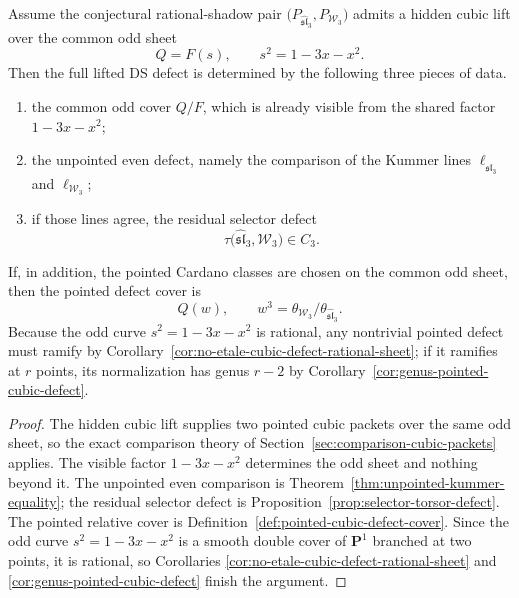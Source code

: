 \begin{theorem}
\label{thm:cubic-rational-shadow-frontier}
Assume the conjectural rational-shadow pair
$\bigl(P_{\widehat{\mathfrak{sl}}_3},P_{\mathcal W_3}\bigr)$ admits a hidden cubic
lift over the common odd sheet
\[
Q=F(s),\qquad s^2=1-3x-x^2.
\]
Then the full lifted DS defect is determined by the following three pieces of
data.
\begin{enumerate}[label=\textup{(\roman*)}]
\item the common odd cover $Q/F$, which is already visible from the shared factor
$1-3x-x^2$;
\item the unpointed even defect, namely the comparison of the Kummer lines
$\ell_{\widehat{\mathfrak{sl}}_3}$ and $\ell_{\mathcal W_3}$;
\item if those lines agree, the residual selector defect
\[
\tau\bigl(\widehat{\mathfrak{sl}}_3,\mathcal W_3\bigr)\in C_3.
\]
\end{enumerate}
If, in addition, the pointed Cardano classes are chosen on the common odd sheet,
then the pointed defect cover is
\[
Q(w),\qquad
w^3=\theta_{\mathcal W_3}/\theta_{\widehat{\mathfrak{sl}}_3}.
\]
Because the odd curve $s^2=1-3x-x^2$ is rational, any nontrivial pointed defect
must ramify by Corollary~\ref{cor:no-etale-cubic-defect-rational-sheet}; if it
ramifies at $r$ points, its normalization has genus $r-2$ by
Corollary~\ref{cor:genus-pointed-cubic-defect}.
\end{theorem}

\begin{proof}
The hidden cubic lift supplies two pointed cubic packets over the same odd sheet,
so the exact comparison theory of
Section~\ref{sec:comparison-cubic-packets} applies.  The visible factor
$1-3x-x^2$ determines the odd sheet and nothing beyond it.  The unpointed even
comparison is Theorem~\ref{thm:unpointed-kummer-equality}; the residual selector
defect is Proposition~\ref{prop:selector-torsor-defect}.  The pointed relative
cover is Definition~\ref{def:pointed-cubic-defect-cover}.  Since the odd curve
$s^2=1-3x-x^2$ is a smooth double cover of $\mathbf P^1$ branched at two points,
it is rational, so Corollaries
\ref{cor:no-etale-cubic-defect-rational-sheet} and
\ref{cor:genus-pointed-cubic-defect} finish the argument.
\end{proof}

